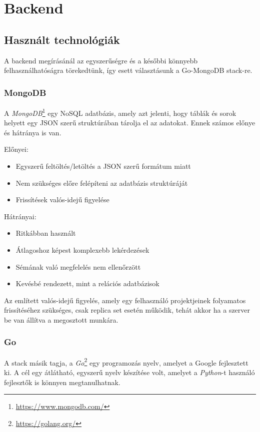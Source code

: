 \section{Backend}
\subsection{Használt technológiák}
A backend megírásánál az egyszerűségre és a későbbi könnyebb felhasználhatóságra törekedtünk, így esett választásunk a Go-MongoDB stack-re.
\subsubsection{MongoDB}
A \emph{MongoDB}\footnote{\url{https://www.mongodb.com/}} egy NoSQL adatbázis, amely azt jelenti, hogy táblák és sorok helyett egy JSON szerű struktúrában tárolja el az adatokat.
Ennek számos előnye és hátránya is van.

\begin{samepage}
    \noindent Előnyei:
    \begin{itemize}
        \item Egyszerű feltöltés/letöltés a JSON szerű formátum miatt
        \item Nem szükséges előre felépíteni az adatbázis struktúráját
        \item Frissítések valós-idejű figyelése
    \end{itemize}

    \noindent Hátrányai:
    \begin{itemize}
        \item Ritkábban használt
        \item Átlagoshoz képest komplexebb lekérdezések
        \item Sémának való megfelelés nem ellenőrzött
        \item Kevésbé rendezett, mint a relációs adatbázisok
    \end{itemize}
\end{samepage}

Az említett valós-idejű figyelés, amely egy felhasználó projektjeinek folyamatos frissítéséhez szükséges, csak replica set esetén működik, tehát akkor ha a szerver be van állítva a megosztott munkára.
\subsubsection{Go}
A stack másik tagja, a \emph{Go}\footnote{\url{https://golang.org/}} egy programozás nyelv, amelyet a Google fejlesztett ki. A cél egy átlátható, egyszerű nyelv készítése volt, amelyet a \emph{Python}-t használó fejlesztők is könnyen megtanulhatnak. 

